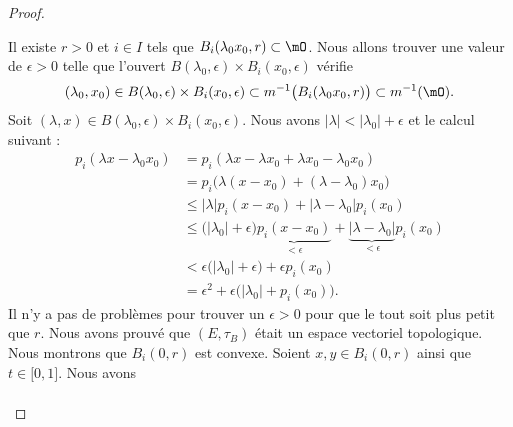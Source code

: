 \begin{proof}
\begin{subproof}
		Il existe \( r>0\) et \( i\in I\) tels que \( B_i(\lambda_0x_0,r)\subset \mO\). Nous allons trouver une valeur de \( \epsilon>0\) telle que l'ouvert \(  B(\lambda_0,\epsilon)\times B_i(x_0,\epsilon)\) vérifie
		\begin{equation}
			(\lambda_0,x_0)\in B(\lambda_0,\epsilon)\times B_i(x_0,\epsilon)\subset m^{-1} \big(  B_i(\lambda_0x_0,r) \big)\subset m^{-1}(\mO).
		\end{equation}
		Soit \( (\lambda,x)\in B(\lambda_0,\epsilon)\times B_i(x_0,\epsilon)\). Nous avons \( | \lambda |<| \lambda_0 |+\epsilon\) et le calcul suivant :
		\begin{subequations}
			\begin{align}
				p_i(\lambda x-\lambda_0x_0) & =p_i(\lambda x-\lambda x_0+\lambda x_0-\lambda_0x_0)                                                                              \\
				                            & =p_i\big( \lambda(x-x_0)+(\lambda-\lambda_0)x_0 \big)                                                                             \\
				                            & \leq | \lambda |p_i(x-x_0)+| \lambda-\lambda_0 |p_i(x_0)                                                                          \\
				                            & \leq \big( | \lambda_0 |+\epsilon \big)\underbrace{p_i(x-x_0)}_{<\epsilon}+\underbrace{| \lambda-\lambda_0 |}_{<\epsilon}p_i(x_0) \\
				                            & <\epsilon\big( | \lambda_0 |+\epsilon \big)+\epsilon p_i(x_0)                                                                     \\
				                            & =\epsilon^2+\epsilon\big( | \lambda_0 |+p_i(x_0) \big).
			\end{align}
		\end{subequations}
		Il n'y a pas de problèmes pour trouver un \( \epsilon>0\) pour que le tout soit plus petit que \( r\).
		Nous avons prouvé que \( (E,\tau_B)\) était un espace vectoriel topologique.
		Nous montrons que \( B_i(0,r)\) est convexe. Soient \( x,y\in B_i(0,r)\) ainsi que \( t\in\mathopen[ 0,1\mathclose]\). Nous avons
		\begin{subequations}
			\begin{align}

\end{align}
\end{subequations}
\end{subproof}
\end{proof}
